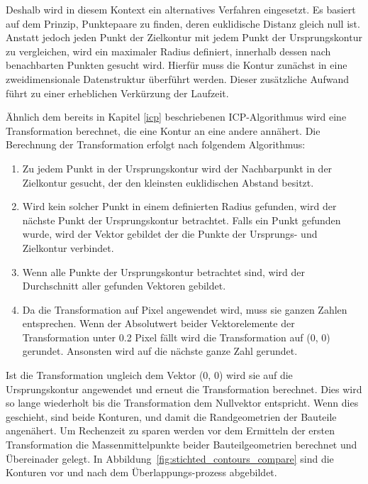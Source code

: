 Deshalb wird in diesem Kontext ein alternatives Verfahren eingesetzt. 
Es basiert auf dem Prinzip, Punktepaare zu finden, deren euklidische
Distanz gleich null ist. Anstatt jedoch jeden Punkt der Zielkontur mit 
jedem Punkt der Ursprungskontur zu vergleichen, wird ein maximaler Radius definiert, 
innerhalb dessen nach benachbarten Punkten gesucht wird. Hierfür muss die Kontur 
zunächst in eine zweidimensionale Datenstruktur überführt werden. Dieser zusätzliche 
Aufwand führt zu einer erheblichen Verkürzung der Laufzeit.

Ähnlich dem bereits in Kapitel \ref{icp} beschriebenen ICP-Algorithmus wird eine Transformation 
berechnet, die eine Kontur an eine andere annähert. Die Berechnung der 
Transformation erfolgt nach folgendem Algorithmus:

\begin{enumerate}
    \item Zu jedem Punkt in der Ursprungskontur wird der Nachbarpunkt
    in der Zielkontur gesucht, der den kleinsten euklidischen Abstand besitzt.
    \item Wird kein solcher Punkt in einem definierten Radius gefunden,
    wird der nächste Punkt der Ursprungskontur
    betrachtet. Falls ein Punkt gefunden wurde, wird der Vektor gebildet der die Punkte
    der Ursprungs- und Zielkontur verbindet.
    \item Wenn alle Punkte der Ursprungskontur betrachtet sind, wird der 
    Durchschnitt aller gefunden Vektoren gebildet.
    \item Da die Transformation auf Pixel angewendet wird, muss sie ganzen Zahlen 
    entsprechen. Wenn der Absolutwert beider Vektorelemente der Transformation 
    unter 0.2 Pixel fällt wird die Transformation auf (0, 0) gerundet.
    Ansonsten wird auf die nächste ganze Zahl gerundet.
\end{enumerate}

Ist die Transformation ungleich dem Vektor (0, 0) wird sie auf die Ursprungskontur 
angewendet und erneut die Transformation berechnet. Dies wird so lange wiederholt bis 
die Transformation dem Nullvektor entspricht. Wenn dies geschieht, sind beide Konturen, 
und damit die Randgeometrien der Bauteile angenähert.
Um Rechenzeit zu sparen werden vor dem Ermitteln der ersten Transformation die 
Massenmittelpunkte beider Bauteilgeometrien berechnet und Übereinader gelegt.
In Abbildung~\ref{fig:stichted_contours_compare} sind die Konturen vor und nach 
dem Überlappungs-prozess abgebildet.

